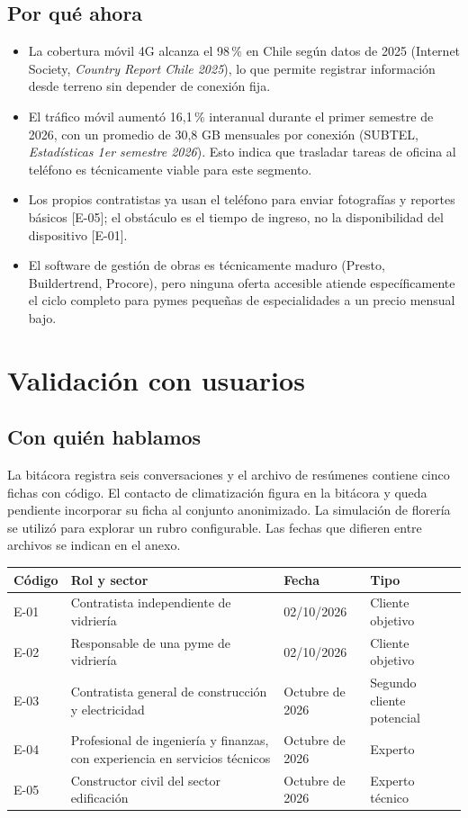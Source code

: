 \documentclass[11pt]{article}
\newcommand{\ev}[1]{\textcolor{prblue}{[#1]}}
\begin{document}
\subsection{Por qué ahora}

\begin{itemize}
  \item La cobertura móvil 4G alcanza el 98\,\% en Chile según datos de 2025
  (Internet Society, \emph{Country Report Chile 2025}), lo que permite registrar
  información desde terreno sin depender de conexión fija.
  \item El tráfico móvil aumentó 16,1\,\% interanual durante el primer semestre de
  2026, con un promedio de 30,8 GB mensuales por conexión (SUBTEL,
  \emph{Estadísticas 1er semestre 2026}). Esto indica que trasladar tareas de
  oficina al teléfono es técnicamente viable para este segmento.
  \item Los propios contratistas ya usan el teléfono para enviar fotografías y
  reportes básicos \ev{E-05}; el obstáculo es el tiempo de ingreso, no la
  disponibilidad del dispositivo \ev{E-01}.
  \item El software de gestión de obras es técnicamente maduro (Presto, Buildertrend,
  Procore), pero ninguna oferta accesible atiende específicamente el ciclo completo
  para pymes pequeñas de especialidades a un precio mensual bajo.
\end{itemize}

\section{Validación con usuarios}

\subsection{Con quién hablamos}
La bitácora registra seis conversaciones y el archivo de resúmenes
contiene cinco fichas con código. El contacto de climatización figura
en la bitácora y queda pendiente incorporar su ficha al conjunto
anonimizado. La simulación de florería se utilizó para explorar un rubro
configurable. Las fechas que difieren entre archivos se indican en el
anexo.

\begin{tabularx}{\linewidth}{@{}lXll@{}}
\toprule
\textbf{Código} & \textbf{Rol y sector} & \textbf{Fecha} & \textbf{Tipo} \\
\midrule
E-01 & Contratista independiente de vidriería & 02/10/2026 & Cliente objetivo \\
E-02 & Responsable de una pyme de vidriería & 02/10/2026 & Cliente objetivo \\
E-03 & Contratista general de construcción y electricidad & Octubre de 2026 & Segundo cliente potencial \\
E-04 & Profesional de ingeniería y finanzas, con experiencia en servicios técnicos & Octubre de 2026 & Experto \\
E-05 & Constructor civil del sector edificación & Octubre de 2026 & Experto técnico \\
\bottomrule
\end{tabularx}
\end{document}
